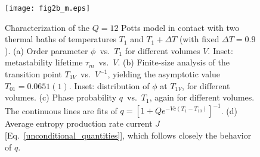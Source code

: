 \documentclass[aps,pre,reprint, amsmath, amssymb,superscriptaddress]{revtex4-1}
\begin{document}

\begin{figure}
    \centering
    \texttt{[image: fig2b\_m.eps]}
    \caption{Characterization of the $Q=12$ Potts model in contact
    with two thermal baths of temperatures $T_1$ and $T_1+\Delta T$ (with fixed $\Delta T = 0.9$).  
    (a) Order parameter $\phi$~vs.~$T_1$ for different volumes $V$.
    Inset: metastability lifetime $\tau_m$~vs.~$V$. 
    (b) Finite-size analysis of the transition point $T_{1V}$~vs.~$V^{-1}$, yielding the asymptotic value $T_{01} = 0.0651(1)$. 
    Inset: distribution of $\phi$ at $T_{1V}$, for different volumes. 
    (c) Phase probability $q$~vs.~$T_1$, again for different volumes. 
    The continuous lines are fits of $q=[1 + Q e^{-Vc(T_1-T_{10})}]^{-1}$.
    (d) Average entropy production rate current $J$ [Eq.~\eqref{unconditional_quantities}], which follows closely the behavior of $q$. 
    }
    \label{fig:potts}
\end{figure}


\end{document}
